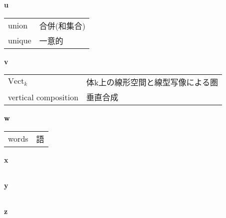 \documentclass[dvipdfmx]{jsarticle}
\begin{document}
\textbf{u}

  \begin{tabular}{ll}
    union & 合併(和集合) \\
    unique & 一意的 \\
  \end{tabular}

\textbf{v}

  \begin{tabular}{ll}
    $\mathrm{Vect}_k$ & 体k上の線形空間と線型写像による圏 \\
    vertical composition & 垂直合成 \\
  \end{tabular}

\textbf{w}

  \begin{tabular}{ll}
    words & 語 \\
  \end{tabular}

\textbf{x}

  \begin{tabular}{ll}
  \end{tabular}

\textbf{y}

  \begin{tabular}{ll}
  \end{tabular}

\textbf{z}

  \begin{tabular}{ll}
  \end{tabular}
\end{document}
